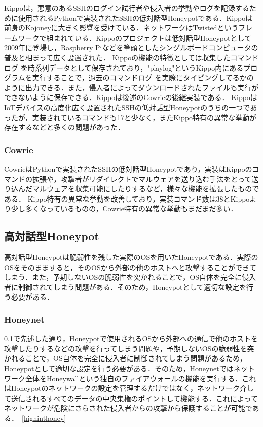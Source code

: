 Kippoは，悪意のあるSSHのログイン試行者や侵入者の挙動やログを記録するために使用されるPythonで実装されたSSHの低対話型Honeypotである\cite{kippo}．Kippoは前身のKojoney\cite{kojoney}に大きく影響を受けている．ネットワークはTwisted\cite{twisted}というフレームワークで組まれている．Kippoのプロジェクトは低対話型Honeypotとして2009年に登場し，Raspberry Pi\cite{rasp}などを筆頭としたシングルボードコンピュータ\cite{singleboard}の普及と相まって広く設置された．
Kippoの機能の特徴としては収集したコマンドログ を時系列データとして保存されており，"playlog"というKippo内にあるプログラムを実行することで，過去のコマンドログ を実際にタイピングしてるかのように出力できる．また，侵入者によってダウンロードされたファイルも実行ができないように保存できる．Kippoは後述のCowrieの後継実装である．\cite{kippowiki}
KippoはIoTデバイスの高度化広く設置されたSSHの低対話型Honeypotのうちの一つであったが，実装されているコマンドも17\cite{kippocommand}と少なく，またKippo特有の異常な挙動が存在するなどと多くの問題があった．

\subsubsection{Cowrie}
\label{tech:Cowrie}
CowrieはPythonで実装されたSSHの低対話型Honeypotであり，実装はKippoのコマンドの拡張や，攻撃者がリダイレクトでマルウェアを送り込む手法をとって送り込んだマルウェアを収集可能にしたりするなど，様々な機能を拡張したものである．
Kippo特有の異常な挙動を改善しており，実装コマンド数は38\cite{cowriecommand}とKippoより少し多くなっているものの\cite{differfromkippo}，Cowrie特有の異常な挙動もまだまだ多い．



\subsection{高対話型Honeypot}
\label{tech:HighInteractionHoneypot}
高対話型Honeypotは脆弱性を残した実際のOSを用いたHoneypotである．実際のOSをそのまますると，そのOSから外部の他のホストへと攻撃することができてしまう．また，予期しないOSの脆弱性を突かれることで，OS自体を完全に侵入者に制御されてしまう問題がある．そのため，Honeypotとして適切な設定を行う必要がある．

\subsubsection{Honeynet}
\label{tech:Honeynet}
\ref{tech:HighInteractionHoneypot}で先述した通り，Honeypotで使用されるOSから外部への通信で他のホストを攻撃したりするなどの攻撃を行ってしまう問題や，予期しないOSの脆弱性を突かれることで，OS自体を完全に侵入者に制御されてしまう問題があるため，Honeypotとして適切な設定を行う必要がある．そのため，Honeynetではネットワーク全体をHoneywallという独自のファイアウォールの機能を実行する．これはHoneypotのネットワークの設定を管理するだけではなく，ネットワーク介して送信されるすべてのデータの中央集権のポイントして機能する．これによってネットワークが危険にさらされた侵入者からの攻撃から保護することが可能である．~\ref{highinthoney}


